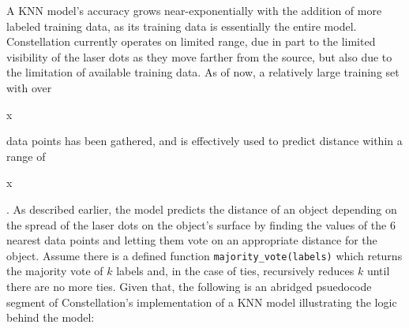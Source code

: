 

A KNN model's accuracy grows near-exponentially with the addition of more labeled training data, as its training data is essentially the entire model. Constellation currently operates on limited range, due in part to the limited visibility of the laser dots as they move farther from the source, but also due to the limitation of available training data. As of now, a relatively large training set with over \begin{it}x\end{it} data points has been gathered, and is effectively used to predict distance within a range of \begin{it}x\end{it}. As described earlier, the model predicts the distance of an object depending on the spread of the laser dots on the object's surface by finding the values of the 6 nearest data points and letting them vote on an appropriate distance for the object. Assume there is a defined function \texttt{majority\_vote(labels)} which returns the majority vote of $k$ labels and, in the case of ties, recursively reduces $k$ until there are no more ties. Given that, the following is an abridged psuedocode segment of Constellation's implementation of a KNN model illustrating the logic behind the model:
